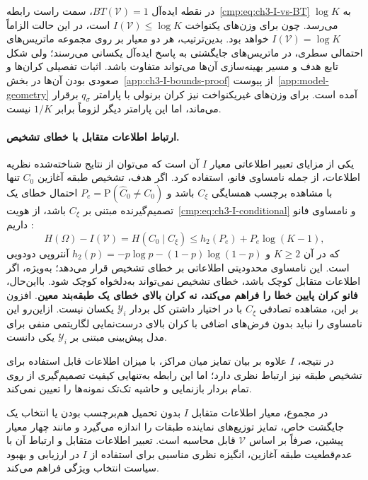 در نقطه ایده‌آل $BT(\mathcal V)=1$، سمت راست رابطه~\eqref{cmp:eq:ch3-I-vs-BT} به $\log K$ می‌رسد. چون برای وزن‌های یکنواخت $I(\mathcal V)\le\log K$ است، در این حالت الزاماً $I(\mathcal V)=\log K$ خواهد بود. بدین‌ترتیب، هر دو معیار بر روی مجموعه ماتریس‌های احتمالی سطری، در ماتریس‌های جایگشتی به پاسخ ایده‌آل یکسانی می‌رسند؛ ولی شکل تابع هدف و مسیر بهینه‌سازی آن‌ها می‌تواند متفاوت باشد. اثبات تفصیلی کران‌ها و صعودی بودن آن‌ها در بخش~\ref{app:ch3-I-bounds-proof} از پیوست~\ref{app:model-geometry} آمده است. برای وزن‌های غیریکنواخت نیز کران برنولی با پارامتر $q_\sigma$ برقرار می‌ماند، اما این پارامتر دیگر لزوماً برابر $1/K$ نیست.

\paragraph{ارتباط اطلاعات متقابل با خطای تشخیص.}
یکی از مزایای تعبیر اطلاعاتی معیار $I$ آن است که می‌توان از نتایج شناخته‌شده نظریه اطلاعات، از جمله نامساوی فانو، استفاده کرد. اگر هدف، تشخیص طبقه آغازین $C_0$ تنها با مشاهده برچسب همسایگی $C_\xi$ باشد و $P_e=\mathrm P(\widehat C_0\ne C_0)$ احتمال خطای یک تصمیم‌گیرنده مبتنی بر $C_\xi$ باشد، از هویت~\eqref{cmp:eq:ch3-I-conditional} و نامساوی فانو داریم \cite{CoverThomas2006}:
\begin{equation}\label{cmp:eq:ch3-I-Fano}
\boxed{H(\Omega)-I(\mathcal V)
=H(C_0\mid C_\xi)
\le h_2(P_e)+P_e\log(K-1),}
\end{equation}
که در آن $K\ge2$ و $h_2(p)=-p\log p-(1-p)\log(1-p)$ آنتروپی دودویی است. این نامساوی محدودیتی اطلاعاتی بر خطای تشخیص قرار می‌دهد؛ به‌ویژه، اگر اطلاعات متقابل کوچک باشد، خطای تشخیص نمی‌تواند به‌دلخواه کوچک شود. بااین‌حال، \textbf{فانو کران پایین خطا را فراهم می‌کند، نه کران بالای خطای یک طبقه‌بند معین}. افزون بر این، مشاهده تصادفی $C_\xi$ با در اختیار داشتن کل بردار $\mathscr Y_i$ یکسان نیست. ازاین‌رو این نامساوی را نباید بدون فرض‌های اضافی با کران بالای درست‌نمایی لگاریتمی منفی برای مدل پیش‌بینی مبتنی بر $\mathscr Y_i$ یکی دانست.

در نتیجه، $I$ علاوه بر بیان تمایز میان مراکز، با میزان اطلاعات
قابل استفاده برای تشخیص طبقه نیز ارتباط نظری دارد؛
اما این رابطه به‌تنهایی کیفیت تصمیم‌گیری از روی
تمام بردار بازنمایی و حاشیه تک‌تک نمونه‌ها را تعیین نمی‌کند.

در مجموع، معیار اطلاعات متقابل $I$ بدون تحمیل هم‌برچسب بودن یا انتخاب یک جایگشت خاص، تمایز توزیع‌های نماینده طبقات را اندازه می‌گیرد و مانند چهار معیار پیشین، صرفاً بر اساس $\mathcal V$ قابل محاسبه است. تعبیر اطلاعات متقابل و ارتباط آن با عدم‌قطعیت طبقه آغازین، انگیزه نظری مناسبی برای استفاده از $I$ در ارزیابی و بهبود سیاست انتخاب ویژگی فراهم می‌کند.



